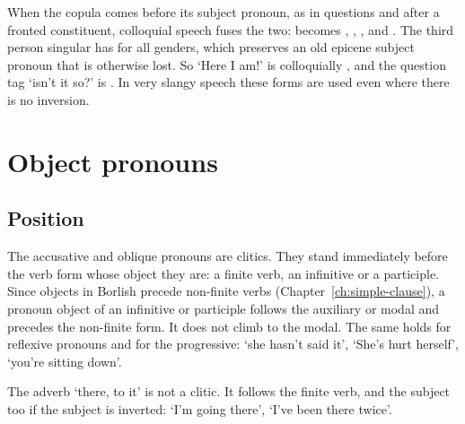 When the copula comes before its subject pronoun, as in questions and after a fronted constituent, colloquial speech fuses the two:  becomes  ,  ,  ,   and  . The third person singular has   for all genders, which preserves an old epicene subject pronoun  that is otherwise lost. So  `Here I am!' is colloquially , and the question tag  `isn't it so?' is . In very slangy speech these forms are used even where there is no inversion.

\section{Object pronouns}\label{sec:object-pronouns}

\subsection{Position}
The accusative and oblique pronouns are clitics. They stand immediately before the verb form whose object they are: a finite verb, an infinitive or a participle. Since objects in Borlish precede non-finite verbs (Chapter~\ref{ch:simple-clause}), a pronoun object of an infinitive or participle follows the auxiliary or modal and precedes the non-finite form. It does not climb to the modal.
The same holds for reflexive pronouns and for the progressive:  `she hasn't said it',  `She's hurt herself',  `you're sitting down'.

The adverb  `there, to it' is not a clitic. It follows the finite verb, and the subject too if the subject is inverted:  `I'm going there',  `I've been there twice'.

